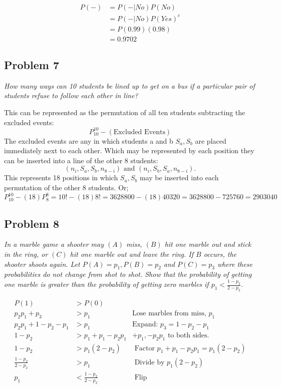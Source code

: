 \documentclass[a4paper,man,natbib]{apa6}
\begin{document}
	\begin{align*}
		P(-) &= P(-|No)P(No) \\
		&= P(-|No)P(Yes)^c \\
		&= P(0.99)(0.98) \\
		&= 0.9702
	\end{align*}
	
\vspace{1em}

\subsection{Problem 7}
\emph{How many ways can 10 students be lined up to get on a bus if a particular pair of students refuse to follow each other in line?}\vspace{1em}

This can be represented as the permutation of all ten students subtracting the excluded events:
$$ P^{10}_{10} - (\text{Excluded Events})$$
The excluded events are any in which students a and b $S_a, S_b$ are placed immediately next to each other. Which may be represented by each position they can be inserted into a line of the other 8 students:
$$ (n_i, S_a, S_b, n_{8-i})\text{ and  }(n_i, S_b, S_a, n_{8-i}).$$
This represents 18 positions in which  $S_a, S_b$ may be inserted into each permutation of the other 8 students. Or;
$$P^{10}_{10} - (18)P^{8}_{8}  = 10! - (18)8! = 3628800 - (18)40320 = 3628800 - 725760 = 2903040$$

\subsection{Problem 8}
\emph{ 
	In a marble game a shooter may $(A)$ miss, $(B)$ hit one marble out and stick in the ring, or $(C)$ hit one marble out and leave the ring. If $B$ occurs, the shooter shoots again. Let  $P(A)=p_1, P(B)=p_2$ and $P(C)=p_3$ where these probabilities do not change from shot to shot. Show that the probability of getting one marble is greater than the probability of getting zero marbles if $p_1 < \frac{1-p_2}{2-p_2}$. }\vspace{1em}

\begin{align*}
	P(1) &> P(0) &\text{}\\
	p_2p_1 + p_3 &> p_1 &\text{Lose marbles from miss, }p_1\\
	p_2p_1 + 1- p_2 - p_1 &> p_1 &\text{Expand: }p_3 = 1- p_2 - p_1\\
	1-p_2  &> p_1 + p_1 - p_2p_1 & +p_1, -p_2p_1 \text{ to both sides.} \\
	1-p_2  &> p_1(2-p_2) & \text{ Factor } p_1 + p_1 - p_2p_1 = p_1(2-p_2) \\
	\frac{1-p_2}{2-p_2}  &> p_1 & \text{ Divide by } p_1(2-p_2) \\
	p_1  &< \frac{1-p_2}{2-p_2}   & \text{ Flip } \\
\end{align*}
\end{document}
